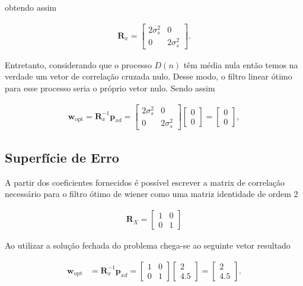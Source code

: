 obtendo assim

\begin{align} 
    \mathbf{R}_{x} = 
    \begin{bmatrix}
        2 \sigma^{2}_{s} & 0 \\
        0  & 2 \sigma^{2}_{s}
    \end{bmatrix}.
\end{align}

Entretanto, considerando que o processo $D(n)$ têm média nula então temos na verdade um vetor de correlação cruzada nulo. Desse modo, o filtro linear
ótimo para esse processo seria o próprio vetor nulo. Sendo assim

\begin{align} 
    \mathbf{w}_{\text{opt}} = \mathbf{R}^{-1}_{x} \mathbf{p}_{xd} = 
    \begin{bmatrix}
        2 \sigma^{2}_{s} & 0 \\
        0  & 2 \sigma^{2}_{s}
    \end{bmatrix}
    \begin{bmatrix}
        0 \\
        0 
    \end{bmatrix} = 
    \begin{bmatrix}
        0 \\
        0 
    \end{bmatrix},  
\end{align}


\subsection{Superfície de Erro} %


A partir dos coeficientes fornecidos é possível escrever a matrix de correlação necessário para o filtro ótimo de wiener como uma matriz identidade de ordem 2
						
\begin{align}
    \mathbf{R}_{X} = \left[ \begin{matrix} 1 & 0 \\ 0 & 1 \end{matrix} \right]
\end{align}

Ao utilizar a solução fechada do problema chega-se ao seguinte vetor resultado

\begin{align}
    \mathbf{w}_{\text{opt}} &= \mathbf{R}^{-1}_{x} \mathbf{p}_{xd} = \left[ \begin{matrix} 1 & 0 \\ 0 & 1 \end{matrix} \right]  \left[ \begin{matrix} 2 \\ 4.5 \end{matrix} \right] = \left[ \begin{matrix} 2 \\ 4.5 \end{matrix} \right].
\end{align}


